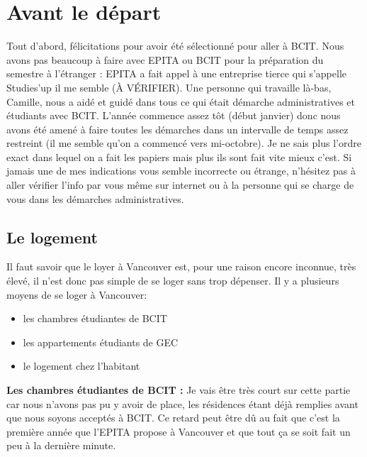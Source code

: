 \documentclass{article}
\begin{document}
\section{Avant le départ}
Tout d'abord, félicitations pour avoir été sélectionné pour aller à BCIT. Nous avons pas beaucoup à faire avec EPITA ou BCIT pour la préparation du semestre à l'étranger : EPITA a fait appel à une entreprise tierce qui s'appelle Studies'up il me semble (À VÉRIFIER). Une personne qui travaille là-bas, Camille, nous a aidé et guidé dans tous ce qui était démarche administratives et étudiants avec BCIT. L'année commence assez tôt (début janvier) donc nous avons été amené à faire toutes les démarches dans un intervalle de temps assez restreint (il me semble qu'on a commencé vers mi-octobre). Je ne sais plus l'ordre exact dans lequel on a fait les papiers mais plus ils sont fait vite mieux c'est.\newline
Si jamais une de mes indications vous semble incorrecte ou étrange, n'hésitez pas à aller vérifier l'info par vous même sur internet ou à la personne qui se charge de vous dans les démarches administratives.
\subsection{Le logement}
Il faut savoir que le loyer à Vancouver est, pour une raison encore inconnue, très élevé, il n'est donc pas simple de se loger sans trop dépenser. Il y a plusieurs moyens de se loger à Vancouver:
\begin{itemize}
    \item les chambres étudiantes de BCIT
    \item les appartements étudiants de GEC
    \item le logement chez l'habitant
\end{itemize}
\noindent\textbf{Les chambres étudiantes de BCIT :}\newline
Je vais être très court sur cette partie car nous n'avons pas pu y avoir de place, les résidences étant déjà remplies avant que nous soyons acceptés à BCIT. Ce retard peut être dû au fait que c'est la première année que l'EPITA propose à  Vancouver et que tout ça se soit fait un peu à la dernière minute.\newline\newline 
\end{document}
